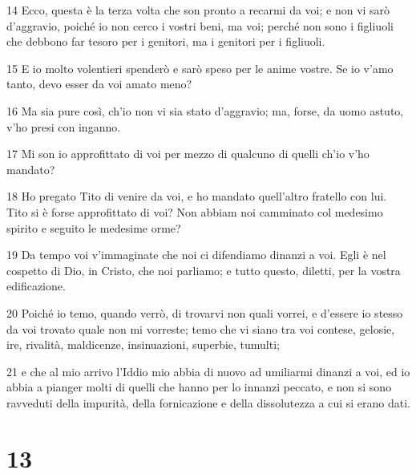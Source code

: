 \par 14 Ecco, questa è la terza volta che son pronto a recarmi da voi; e non vi sarò d'aggravio, poiché io non cerco i vostri beni, ma voi; perché non sono i figliuoli che debbono far tesoro per i genitori, ma i genitori per i figliuoli.
\par 15 E io molto volentieri spenderò e sarò speso per le anime vostre. Se io v'amo tanto, devo esser da voi amato meno?
\par 16 Ma sia pure così, ch'io non vi sia stato d'aggravio; ma, forse, da uomo astuto, v'ho presi con inganno.
\par 17 Mi son io approfittato di voi per mezzo di qualcuno di quelli ch'io v'ho mandato?
\par 18 Ho pregato Tito di venire da voi, e ho mandato quell'altro fratello con lui. Tito si è forse approfittato di voi? Non abbiam noi camminato col medesimo spirito e seguito le medesime orme?
\par 19 Da tempo voi v'immaginate che noi ci difendiamo dinanzi a voi. Egli è nel cospetto di Dio, in Cristo, che noi parliamo; e tutto questo, diletti, per la vostra edificazione.
\par 20 Poiché io temo, quando verrò, di trovarvi non quali vorrei, e d'essere io stesso da voi trovato quale non mi vorreste; temo che vi siano tra voi contese, gelosie, ire, rivalità, maldicenze, insinuazioni, superbie, tumulti;
\par 21 e che al mio arrivo l'Iddio mio abbia di nuovo ad umiliarmi dinanzi a voi, ed io abbia a pianger molti di quelli che hanno per lo innanzi peccato, e non si sono ravveduti della impurità, della fornicazione e della dissolutezza a cui si erano dati.

\chapter{13}

